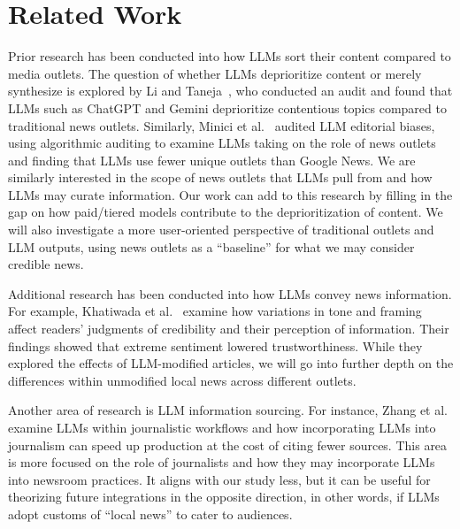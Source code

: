 \section{Related Work}\label{sec:related}

Prior research has been conducted into how LLMs sort their content compared to media outlets. The question of whether LLMs deprioritize content or merely synthesize is explored by Li and Taneja~\cite{li2026mirror}, who conducted an audit and found that LLMs such as ChatGPT and Gemini deprioritize contentious topics compared to traditional news outlets. Similarly, Minici et al.~\cite{minici2025auditing} audited LLM editorial biases, using algorithmic auditing to examine LLMs taking on the role of news outlets and finding that LLMs use fewer unique outlets than Google News. We are similarly interested in the scope of news outlets that LLMs pull from and how LLMs may curate information. Our work can add to this research by filling in the gap on how paid/tiered models contribute to the deprioritization of content. We will also investigate a more user-oriented perspective of traditional outlets and LLM outputs, using news outlets as a ``baseline'' for what we may consider credible news.

Additional research has been conducted into how LLMs convey news information. For example, Khatiwada et al.~\cite{khatiwada2026rewrites} examine how variations in tone and framing affect readers' judgments of credibility and their perception of information. Their findings showed that extreme sentiment lowered trustworthiness. While they explored the effects of LLM-modified articles, we will go into further depth on the differences within unmodified local news across different outlets.

Another area of research is LLM information sourcing. For instance, Zhang et al.~\cite{zhang2025institutional} examine LLMs within journalistic workflows and how incorporating LLMs into journalism can speed up production at the cost of citing fewer sources. This area is more focused on the role of journalists and how they may incorporate LLMs into newsroom practices. It aligns with our study less, but it can be useful for theorizing future integrations in the opposite direction, in other words, if LLMs adopt customs of ``local news'' to cater to audiences.